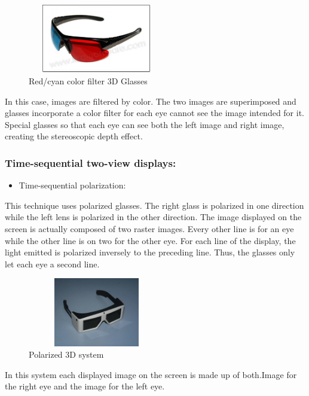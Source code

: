 \begin{figure}[h!]
\begin{center}
\begin{minipage}{1\linewidth}
\centering\includegraphics[width=6cm,height=30mm]{image/1.jpg}
\caption{Red/cyan color filter 3D Glasses\cite{ViewingOn3D}}
\end{minipage}
\end{center}
\end{figure}

In this case, images are filtered by color. The two images are superimposed and glasses incorporate a color filter for each eye cannot see the image intended for it.\\
Special glasses so that each eye can see both the left image and right image, creating the stereoscopic depth effect.

\subsubsection{Time-sequential two-view displays:}
\begin{itemize}
\item Time-sequential polarization:
\end{itemize}
This technique uses polarized glasses. The right glass is polarized in one direction while the left lens is polarized in the other direction. The image displayed on the screen is actually composed of two raster images. Every other line is for an eye while the other line is on two for the other eye. For each line of the display, the light emitted is polarized inversely to the preceding line. Thus, the glasses only let each eye a second line.

\begin{figure}[h!]
\begin{center}
\begin{minipage}{1\linewidth}
\centering\includegraphics[width=6cm,height=30mm]{image/2.jpg}
\caption{Polarized 3D system\cite{Polarized3D}}
\end{minipage}
\end{center}
\end{figure}
In this system each displayed image on the screen is made up of both.Image for the right eye and the image for the left eye.
